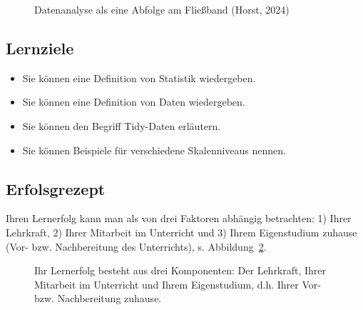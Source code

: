 \documentclass[
  letterpaper,
]{scrbook}
\providecommand{\tightlist}{%
  \setlength{\itemsep}{0pt}\setlength{\parskip}{0pt}}\usepackage{longtable,booktabs,array}
\theoremstyle{definition}
\theoremstyle{definition}
\theoremstyle{definition}
\theoremstyle{remark}
\begin{document}
\begin{figure}


\caption{\label{fig-tidy5}Datenanalyse als eine Abfolge am Fließband
(Horst, 2024)}

\end{figure}%

\subsection{Lernziele}\label{lernziele-1}

\begin{itemize}
\tightlist
\item
  Sie können eine Definition von Statistik wiedergeben.
\item
  Sie können eine Definition von Daten wiedergeben.
\item
  Sie können den Begriff Tidy-Daten erläutern.
\item
  Sie können Beispiele für verschiedene Skalenniveaus nennen.
\end{itemize}

\subsection{Erfolsgrezept}\label{erfolsgrezept}

Ihren Lernerfolg kann man als von drei Faktoren abhängig betrachten: 1)
Ihrer Lehrkraft, 2) Ihrer Mitarbeit im Unterricht und 3) Ihrem
Eigenstudium zuhause (Vor- bzw. Nachbereitung des Unterrichts), s.
Abbildung~\ref{fig-erfolgsrezept}.

\begin{figure}


\caption{\label{fig-erfolgsrezept}Ihr Lernerfolg besteht aus drei
Komponenten: Der Lehrkraft, Ihrer Mitarbeit im Unterricht und Ihrem
Eigenstudium, d.h. Ihrer Vor- bzw. Nachbereitung zuhause.}

\end{figure}%
\end{document}
